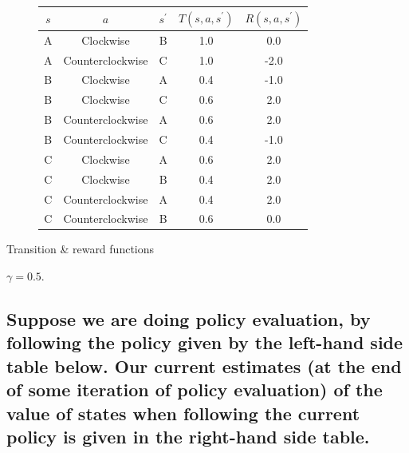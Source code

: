 \documentclass{homework}
\begin{document}
\clearpage
\exercise[2]
\begin{figure}[h!]
    \centering
    \begin{minipage}[b]{0.49\textwidth}
        \centering
        
    \end{minipage}
    \begin{minipage}[b]{0.49\textwidth}
        \begin{tabular}{c|c|c|c|c}
            \toprule
            $s$ & $a$ & $s^{\prime}$ & $T(s, a, s^{\prime})$ & $R(s, a, s^{\prime})$ \\
            \midrule
            A & Clockwise & B & 1.0 & 0.0 \\
            A & Counterclockwise & C & 1.0 & -2.0 \\
            B & Clockwise & A & 0.4 & -1.0 \\
            B & Clockwise & C & 0.6 & 2.0 \\
            B & Counterclockwise & A & 0.6 & 2.0 \\
            B & Counterclockwise & C & 0.4 & -1.0 \\
            C & Clockwise & A & 0.6 & 2.0 \\
            C & Clockwise & B & 0.4 & 2.0 \\
            C & Counterclockwise & A & 0.4 & 2.0 \\
            C & Counterclockwise & B & 0.6 & 0.0 \\
            \bottomrule
        \end{tabular}
    \end{minipage}
    \label{fig:q2}
\end{figure}

\begin{table}[h!]
    \centering
    \caption{Transition \& reward functions}
    \label{tab:q2}
\end{table}
$\gamma = 0.5$.

\subsection{Suppose we are doing policy evaluation, by following the policy given by the left-hand side table below. Our current estimates (at the end of some iteration of policy evaluation) of the value of states when following the current policy is given in the right-hand side table.}
\end{document}
